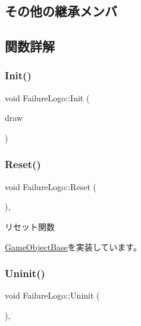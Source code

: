 \subsection*{その他の継承メンバ}


\subsection{関数詳解}
\mbox{\label{class_failure_logo_a22da89def55023f43860cf646da7a74c}} 
\subsubsection{\texorpdfstring{Init()}{Init()}}
{\footnotesize\ttfamily void Failure\+Logo\+::\+Init (\begin{DoxyParamCaption}\item[{\mbox{\hyperlink{class_draw_base}{Draw\+Base}} $\ast$}]{draw }\end{DoxyParamCaption})}

\mbox{\label{class_failure_logo_a542b1617087a6701f7edb345e2a72e01}} 
\subsubsection{\texorpdfstring{Reset()}{Reset()}}
{\footnotesize\ttfamily void Failure\+Logo\+::\+Reset (\begin{DoxyParamCaption}{ }\end{DoxyParamCaption})\hspace{0.3cm}{\ttfamily [override]}, {\ttfamily [virtual]}}



リセット関数 



\mbox{\hyperlink{class_game_object_base_a85c59554f734bcb09f1a1e18d9517dce}{Game\+Object\+Base}}を実装しています。

\mbox{\label{class_failure_logo_adbe01fc4567ade0e788f511f5162299c}} 
\subsubsection{\texorpdfstring{Uninit()}{Uninit()}}
{\footnotesize\ttfamily void Failure\+Logo\+::\+Uninit (\begin{DoxyParamCaption}{ }\end{DoxyParamCaption})\hspace{0.3cm}{\ttfamily [override]}, {\ttfamily [virtual]}}




